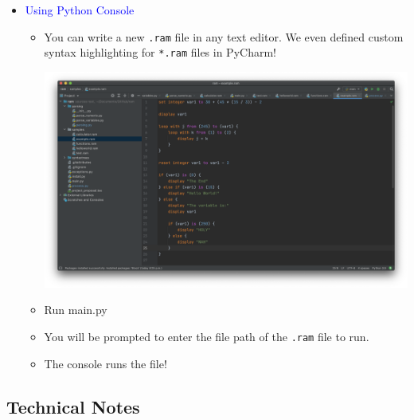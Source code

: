 \documentclass[fontsize=11pt]{article}
\newcommand{\blue}[1]{\textcolor{blue}{#1}}
\begin{document}
  \begin{itemize}
        \item \blue{Using Python Console}
        \begin{itemize}
            \item You can write a new \texttt{.ram} file in any text editor. We even defined custom syntax highlighting for \texttt{*.ram} files in PyCharm!
            
            \begin{center}
                \includegraphics[scale=0.2]{terminal5.png}
            \end{center}
            
            \item Run main.py
            
            \item You will be prompted to enter the file path of the \texttt{.ram} file to run.
            
            \item The console runs the file!
        \end{itemize}
    \end{itemize} 

\subsection*{Technical Notes}
\end{document}

